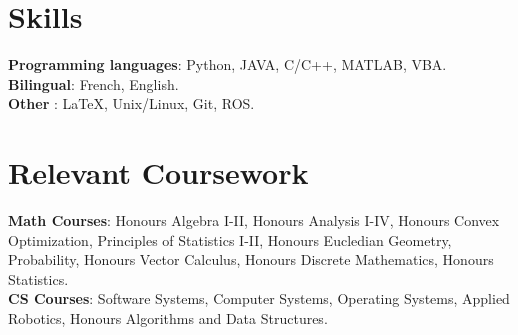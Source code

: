 \documentclass[letterpaper,11pt]{article}
\begin{document}
\section{Skills}
\begin{itemize}[leftmargin=0.15in, label={}]
    \normalsize{\item{
     \textbf{Programming languages}{: Python, JAVA, C/C++, MATLAB, VBA.}\\
     \textbf{Bilingual}{: French, English.}\\
     \textbf{Other }{: \LaTeX, Unix/Linux, Git, ROS.}}}
 \end{itemize}
\section{Relevant Coursework}
\begin{itemize}[leftmargin=0.15in, label={}]
    \normalsize{\item{
     \textbf{Math Courses}{: Honours Algebra I-II, Honours Analysis I-IV, Honours Convex Optimization, Principles of Statistics I-II, Honours Eucledian Geometry, Probability, Honours Vector Calculus, Honours Discrete Mathematics, Honours Statistics. } \\
     \textbf{CS Courses}{: Software Systems, Computer Systems, Operating Systems, Applied Robotics, Honours Algorithms and Data Structures.}
    }}    
 \end{itemize}
\end{document}
